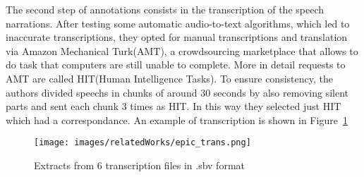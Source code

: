 The second step of annotations consists in the transcription of the speech narrations. After testing some automatic audio-to-text 
algorithms, which led to inaccurate transcriptions, they opted for manual transcriptions and translation via Amazon Mechanical Turk(AMT), a crowdsourcing
marketplace that allows to do task that computers  are still unable to complete. More in detail requests to AMT are called HIT(Human Intelligence Tasks).
To ensure consistency, the authors divided speechs in chunks of around 30 seconds by also removing silent parts and sent each chunk 3 times as HIT.
In this way they selected just HIT which had a correspondance. An example of transcription is shown in Figure~\ref{fig:epic_trans}
\begin{figure}[t]
    \centering
    \texttt{[image: images/relatedWorks/epic\_trans.png]} %
    \caption{Extracts from 6 transcription files in .sbv format}\label{fig:epic_trans}
\end{figure}

